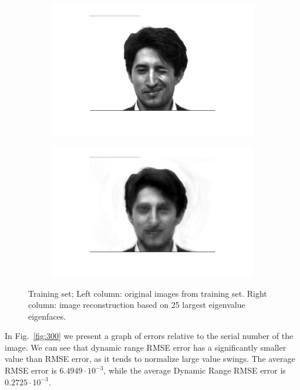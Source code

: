 \documentclass[a4paper]{iacas}
\begin{document}
\begin{figure}[!htbp]
	\begin{subfigure}[b]{0.4\textwidth}
		\includegraphics[width=\textwidth]{3302.jpg}
		\caption{}
		\label{fig:3302}
	\end{subfigure}
	\begin{subfigure}[b]{0.4\textwidth}
		\includegraphics[width=\textwidth]{3301.jpg}
		\caption{}
		\label{fig:3301}
	\end{subfigure}
	
	\caption{Training set; Left column: original images from training set. Right column: image reconstruction based on 25 largest eigenvalue eigenfaces.}
	\label{fig:3000}
\end{figure}

In Fig.~\ref{fig:300} we present a graph of errors relative to the serial number of the image. We can see that dynamic range RMSE error has a significantly smaller value than RMSE error, as it tends to normalize large value swings. The average RMSE error is $6.4949 \cdot 10^{-3}$, while the average Dynamic Range RMSE error is $0.2725 \cdot 10^{-3}$.
\end{document}
